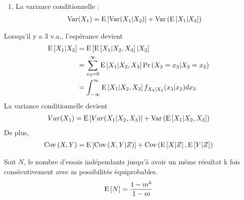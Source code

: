 \documentclass[10pt, french, landscape]{article}
\begin{document}
\begin{multicols*}{2}
\begin{enumerate}[label=\faAngleRight]
\item La variance conditionnelle : 
\begin{align*}
\mathrm{Var} (X_1) = \mathrm{E} \left[ \mathrm{Var} (X_1 | X_2) \right] + \mathrm{Var} \left( \mathrm{E} \left[ X_1 | X_2 \right] \right)
\end{align*}
\end{enumerate}

Lorsqu'il y a 3 v.a., l'espérance devient
\begin{align*}
\mathrm{E} \left[ X_1 | X_2 \right]	& = \mathrm{E} \left[ \mathrm{E} \left[ X_1 | X_2, X_3 \right] | X_2 \right] \\
	& = \sum_{x_3 = 0}^{\infty} \mathrm{E} \left[ X_1 | X_2, X_3 \right] \Pr \left( X_3 = x_3 | X_2 = x_2 \right) \\
	& = \int_{-\infty}^{\infty} \mathrm{E} \left[ X_1 | X_2, X_3 \right] f_{X_3| X_2}(x_3 | x_2) dx_3
\end{align*}
La variance conditionnelle devient
\begin{align*}
Var(X_1) = \mathrm{E} \left[ Var(X_1 | X_2, X_3) \right]  + \mathrm{Var} \left( \mathrm{E} \left[ X_1 | X_2, X_3 \right] \right)
\end{align*}
De plus,
\begin{align*}
\mathrm{Cov} \left( X, Y \right) = \mathrm{E} \left[ \mathrm{Cov} \left( X, Y | Z \right) \right] + \mathrm{Cov} \left( \mathrm{E} \left[ X | Z \right], \mathrm{E} \left[ Y | Z \right] \right)
\end{align*}


Soit $N$, le nombre d'essais indépendants jusqu'à avoir un même résultat k fois consécutivement avec m possibilités équiprobables.
\begin{align*}
	\mathrm{E} \left[ N \right] &= \frac{1 - m^{k}}{1 - m} \\
\end{align*}

%


\end{multicols*}
\end{document}
